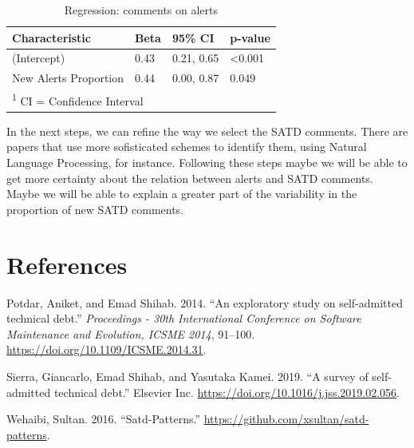 \documentclass[
]{article}
\begin{document}
\small

\begin{table}

\caption{\label{tab:unnamed-chunk-23}\label{tab_reg} Regression: comments on alerts}
\centering
\begin{tabular}[t]{l|l|l|l}
\hline
Characteristic & Beta & 95\% CI & p-value\\
\hline
(Intercept) & 0.43 & 0.21, 0.65 & <0.001\\
\hline
New Alerts Proportion & 0.44 & 0.00, 0.87 & 0.049\\
\hline
\multicolumn{4}{l}{\textsuperscript{1} CI = Confidence Interval}\\
\end{tabular}
\end{table}

\normalsize

In the next steps, we can refine the way we select the SATD comments.
There are papers that use more sofisticated schemes to identify them,
using Natural Language Processing, for instance. Following these steps
maybe we will be able to get more certainty about the relation between
alerts and SATD comments. Maybe we will be able to explain a greater
part of the variability in the proportion of new SATD comments.

\section{References}

\hypertarget{refs}{}
\leavevmode\hypertarget{ref-Potdar2014}{}%
Potdar, Aniket, and Emad Shihab. 2014. ``An exploratory study on
self-admitted technical debt.'' \emph{Proceedings - 30th International
Conference on Software Maintenance and Evolution, ICSME 2014}, 91--100.
\url{https://doi.org/10.1109/ICSME.2014.31}.

\leavevmode\hypertarget{ref-Sierra2019}{}%
Sierra, Giancarlo, Emad Shihab, and Yasutaka Kamei. 2019. ``A survey of
self-admitted technical debt.'' Elsevier Inc.
\url{https://doi.org/10.1016/j.jss.2019.02.056}.

\leavevmode\hypertarget{ref-Wehaibi2016}{}%
Wehaibi, Sultan. 2016. ``Satd-Patterns.''
\url{https://github.com/xsultan/satd-patterns}.
\end{document}

